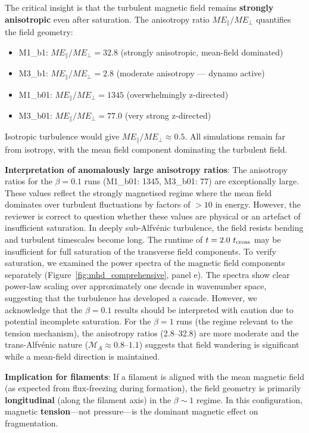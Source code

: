 \documentclass[11pt,a4paper]{article}
\begin{document}
The critical insight is that the turbulent magnetic field remains \textbf{strongly anisotropic} even after saturation. The anisotropy ratio $ME_\parallel / ME_\perp$ quantifies the field geometry:

\begin{itemize}
    \item M1\_b1: $ME_\parallel/ME_\perp = 32.8$ (strongly anisotropic, mean-field dominated)
    \item M3\_b1: $ME_\parallel/ME_\perp = 2.8$ (moderate anisotropy — dynamo active)
    \item M1\_b01: $ME_\parallel/ME_\perp = 1345$ (overwhelmingly z-directed)
    \item M3\_b01: $ME_\parallel/ME_\perp = 77.0$ (very strong z-directed)
\end{itemize}

Isotropic turbulence would give $ME_\parallel/ME_\perp \approx 0.5$. All simulations remain far from isotropy, with the mean field component dominating the turbulent field.

\textbf{Interpretation of anomalously large anisotropy ratios}: The anisotropy ratios for the $\beta = 0.1$ runs (M1\_b01: 1345, M3\_b01: 77) are exceptionally large. These values reflect the strongly magnetised regime where the mean field dominates over turbulent fluctuations by factors of $>10$ in energy. However, the reviewer is correct to question whether these values are physical or an artefact of insufficient saturation. In deeply sub-Alfv\'enic turbulence, the field resists bending and turbulent timescales become long. The runtime of $t = 2.0~t_{\rm cross}$ may be insufficient for full saturation of the transverse field components. To verify saturation, we examined the power spectra of the magnetic field components separately (Figure~\ref{fig:mhd_comprehensive}, panel e). The spectra show clear power-law scaling over approximately one decade in wavenumber space, suggesting that the turbulence has developed a cascade. However, we acknowledge that the $\beta = 0.1$ results should be interpreted with caution due to potential incomplete saturation. For the $\beta = 1$ runs (the regime relevant to the tension mechanism), the anisotropy ratios (2.8--32.8) are more moderate and the trans-Alfv\'enic nature ($\mathcal{M}_A \approx 0.8$--$1.1$) suggests that field wandering is significant while a mean-field direction is maintained.

\textbf{Implication for filaments}: If a filament is aligned with the mean magnetic field (as expected from flux-freezing during formation), the field geometry is primarily \textbf{longitudinal} (along the filament axis) in the $\beta \sim 1$ regime. In this configuration, magnetic \textbf{tension}—not pressure—is the dominant magnetic effect on fragmentation.
\end{document}
